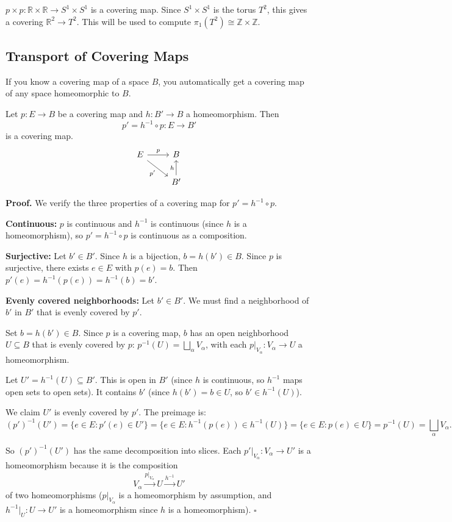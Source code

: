 \documentclass[11pt]{report}
\renewenvironment{proof}[1][Proof]{\noindent\textbf{#1.} }{\hfill$\square$\par\vspace{5pt}}
\begin{document}
\begin{exbox}
$p \times p: \mathbb{R} \times \mathbb{R} \to S^1 \times S^1$ is a covering map. Since $S^1 \times S^1$ is the torus $T^2$, this gives a covering $\mathbb{R}^2 \to T^2$. This will be used to compute $\pi_1(T^2) \cong \mathbb{Z} \times \mathbb{Z}$.
\end{exbox}

\subsection{Transport of Covering Maps}

If you know a covering map of a space $B$, you automatically get a covering map of any space homeomorphic to $B$.

\begin{propbox}
Let $p: E \to B$ be a covering map and $h: B' \to B$ a homeomorphism. Then
\[p' = h^{-1} \circ p: E \to B'\]
is a covering map.
\[
\begin{tikzcd}
E \arrow[r, "p"] \arrow[dr, "p'"'] & B \\
& B' \arrow[u, "h"]
\end{tikzcd}
\]
\end{propbox}

\begin{proof}
We verify the three properties of a covering map for $p' = h^{-1} \circ p$.

\textbf{Continuous:} $p$ is continuous and $h^{-1}$ is continuous (since $h$ is a homeomorphism), so $p' = h^{-1} \circ p$ is continuous as a composition.

\textbf{Surjective:} Let $b' \in B'$. Since $h$ is a bijection, $b = h(b') \in B$. Since $p$ is surjective, there exists $e \in E$ with $p(e) = b$. Then $p'(e) = h^{-1}(p(e)) = h^{-1}(b) = b'$.

\textbf{Evenly covered neighborhoods:} Let $b' \in B'$. We must find a neighborhood of $b'$ in $B'$ that is evenly covered by $p'$.

Set $b = h(b') \in B$. Since $p$ is a covering map, $b$ has an open neighborhood $U \subseteq B$ that is evenly covered by $p$: $p^{-1}(U) = \bigsqcup_\alpha V_\alpha$, with each $p|_{V_\alpha}: V_\alpha \to U$ a homeomorphism.

Let $U' = h^{-1}(U) \subseteq B'$. This is open in $B'$ (since $h$ is continuous, so $h^{-1}$ maps open sets to open sets). It contains $b'$ (since $h(b') = b \in U$, so $b' \in h^{-1}(U)$).

We claim $U'$ is evenly covered by $p'$. The preimage is:
\[(p')^{-1}(U') = \{e \in E : p'(e) \in U'\} = \{e \in E : h^{-1}(p(e)) \in h^{-1}(U)\} = \{e \in E : p(e) \in U\} = p^{-1}(U) = \bigsqcup_\alpha V_\alpha.\]

So $(p')^{-1}(U')$ has the same decomposition into slices. Each $p'|_{V_\alpha}: V_\alpha \to U'$ is a homeomorphism because it is the composition
\[V_\alpha \xrightarrow{p|_{V_\alpha}} U \xrightarrow{h^{-1}} U'\]
of two homeomorphisms ($p|_{V_\alpha}$ is a homeomorphism by assumption, and $h^{-1}|_U: U \to U'$ is a homeomorphism since $h$ is a homeomorphism).
\end{proof}
\end{document}
